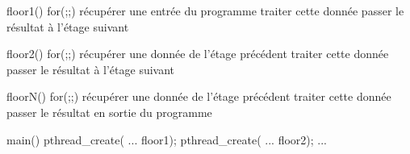 \begin{codeblock}[list text={Création Thread},title={Création de threads}]
floor1() {
  for(;;) {
    récupérer une entrée du programme
    traiter cette donnée
    passer le résultat à l'étage suivant
  }
}

floor2() {
  for(;;) {
    récupérer une donnée de l'étage précédent
    traiter cette donnée
    passer le résultat à l'étage suivant
  }
}

floorN() {
  for(;;) {
    récupérer une donnée de l'étage précédent
    traiter cette donnée
    passer le résultat en sortie du programme
  }
}

main() {
  pthread_create( ... floor1);
  pthread_create( ... floor2);
  ...
}
\end{codeblock}
